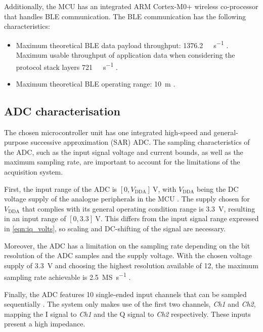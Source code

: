 Additionally, the MCU has an integrated ARM Cortex-M0+ wireless co-processor that handles BLE communication. The BLE communication has the following characteristics:
\begin{itemize}
	\item Maximum theoretical BLE data payload throughput: \SI{1376.2}{\kilo\bit\per\second} \cite{NordicSemiconductor2019,Bluetooth52}. Maximum usable throughput of application data when considering the protocol stack layers \SI{721}{\kilo\bit\per\second} \cite{STMicroelectronics2022b}.
	\item Maximum theoretical BLE operating range: \SI{10}{\meter} \cite{Bluetooth52}.
\end{itemize}

\subsection{ADC characterisation}\label{sec:adc1-characterisation}

The chosen microcontroller unit has one integrated high-speed and general-purpose successive approximation (SAR) ADC. The sampling characteristics of the ADC, such as the input signal voltage and current bounds, as well as the maximum sampling rate, are important to account for the limitations of the acquisition system.

First, the input range of the ADC is $[0, V_\mathrm{DDA}]\ \si{\volt}$, with $V_\mathrm{DDA}$ being the DC voltage supply of the analogue peripherals in the MCU \cite[p.~103]{STMicroelectronics2022}. The supply chosen for $V_\mathrm{DDA}$ that complies with its general operating condition range \cite[p.~62]{STMicroelectronics2022} is \SI{3.3}{\volt}, resulting in an input range of $[0, 3.3]\ \si{\volt}$. This differs from the input signal range expressed in \cref{eqn:iq_volts}, so scaling and DC-shifting of the signal are necessary.

Moreover, the ADC has a limitation on the sampling rate depending on the bit resolution of the ADC samples and the supply voltage. With the chosen voltage supply of \SI{3.3}{\volt} and choosing the highest resolution available of \SI{12}{\bit}, the maximum sampling rate achievable is \SI{2.5}{\mega S\per\second} \cite[p.~103]{STMicroelectronics2022}.

Finally, the ADC features 10 single-ended input channels that can be sampled sequentially \cite[p.~355]{STMicroelectronics2022a}. The system only makes use of the first two channels, \textit{Ch1} and \textit{Ch2}, mapping the I signal to \textit{Ch1} and the Q signal to \textit{Ch2} respectively. These inputs present a high impedance.


